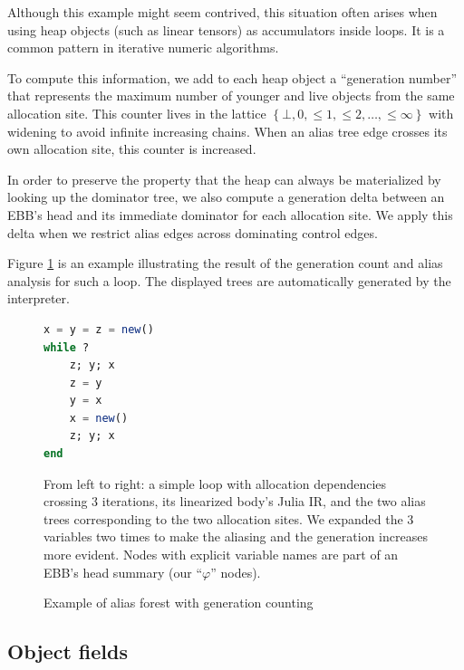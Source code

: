 \documentclass[11pt]{article}
\renewcommand{\phi}{\varphi}
\begin{document}
Although this example might seem contrived, this situation often arises when using heap objects (such as linear tensors) as accumulators inside loops.
It is a common pattern in iterative numeric algorithms.

To compute this information, we add to each heap object a ``generation number'' that represents the maximum number of younger and live objects from the same allocation site. This counter lives in the lattice $\left\{\bot, 0, \leq 1, \leq 2, \dots, \leq \infty \right\}$ with widening to avoid infinite increasing chains.
When an alias tree edge crosses its own allocation site, this counter is increased.

In order to preserve the property that the heap can always be materialized by looking up the dominator tree, we also compute a generation delta between an EBB's head and its immediate dominator for each allocation site.
We apply this delta when we restrict alias edges across dominating control edges.

Figure \ref{fig:gencount} is an example illustrating the result of the generation count and alias analysis for such a loop.
The displayed trees are automatically generated by the interpreter.

\begin{figure}

\begin{minipage}{0.2\linewidth}
\begin{lstlisting}[language=julia]
x = y = z = new()
while ?
    z; y; x
    z = y
    y = x
    x = new()
    z; y; x
end
\end{lstlisting}
\end{minipage}
\qquad
\begin{minipage}{0.4\linewidth}
\scalebox{.7}{}
\end{minipage}
\caption{Example of alias forest with generation counting}
From left to right: a simple loop with allocation dependencies crossing 3 iterations, its linearized body's Julia IR, and the two alias trees corresponding to the two allocation sites.
We expanded the 3 variables two times to make the aliasing and the generation increases more evident.
Nodes with explicit variable names are part of an EBB's head summary (our ``$\phi$'' nodes).
\label{fig:gencount}
\end{figure}



\subsection*{Object fields}
\end{document}
